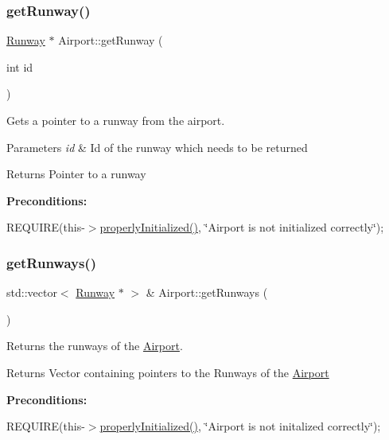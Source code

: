 \subsubsection{\texorpdfstring{get\+Runway()}{getRunway()}}
{\footnotesize\ttfamily \mbox{\hyperlink{class_runway}{Runway}} $\ast$ Airport\+::get\+Runway (\begin{DoxyParamCaption}\item[{int}]{id }\end{DoxyParamCaption})}



Gets a pointer to a runway from the airport. 


\begin{DoxyParams}{Parameters}
{\em id} & Id of the runway which needs to be returned \\
\hline
\end{DoxyParams}
\begin{DoxyReturn}{Returns}
Pointer to a runway
\end{DoxyReturn}
{\bfseries Preconditions\+:}
\begin{DoxyItemize}
\item R\+E\+Q\+U\+I\+RE(this-\/$>$\mbox{\hyperlink{class_airport_aa13e68ac58e8875837fbe888325cfff6}{properly\+Initialized()}}, \char`\"{}\+Airport is not initialized correctly\char`\"{}); 
\end{DoxyItemize}\mbox{\label{class_airport_a45ebc0d8a4e5b8efa6efb31b03955dbd}} 
\subsubsection{\texorpdfstring{get\+Runways()}{getRunways()}}
{\footnotesize\ttfamily std\+::vector$<$ \mbox{\hyperlink{class_runway}{Runway}} $\ast$ $>$ \& Airport\+::get\+Runways (\begin{DoxyParamCaption}{ }\end{DoxyParamCaption})}



Returns the runways of the \mbox{\hyperlink{class_airport}{Airport}}. 

\begin{DoxyReturn}{Returns}
Vector containing pointers to the Runways of the \mbox{\hyperlink{class_airport}{Airport}}
\end{DoxyReturn}
{\bfseries Preconditions\+:}
\begin{DoxyItemize}
\item R\+E\+Q\+U\+I\+RE(this-\/$>$\mbox{\hyperlink{class_airport_aa13e68ac58e8875837fbe888325cfff6}{properly\+Initialized()}}, \char`\"{}\+Airport is not initalized correctly\char`\"{}); 
\end{DoxyItemize}\mbox{\label{class_airport_acdf571dae312ffa3ac5bd0710aa1cb56}} 
